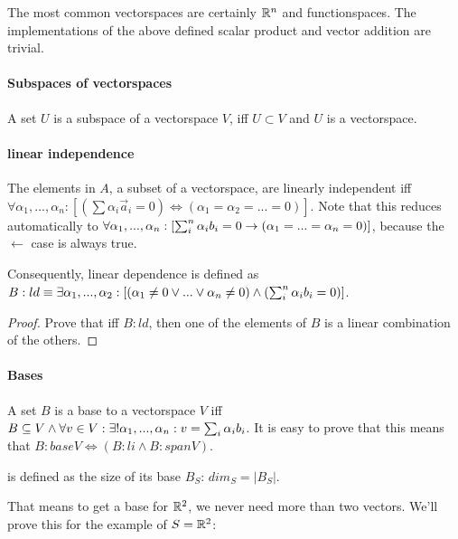 The most common vectorspaces are certainly $\mathbb{R}^n$ and functionspaces.
The implementations of the above defined scalar product and vector addition are trivial.







\paragraph{Subspaces of vectorspaces}
A set $U$ is a subspace of a vectorspace $V$, iff $U \subset V$ and $U$ is a vectorspace.








\paragraph{linear independence} 
The elements in $A$, a subset of a vectorspace, are linearly independent iff $\forall \alpha_1, ...,\alpha_n: [( \sum \alpha_i \vec{a}_i = 0 ) \iff ( \alpha_1 = \alpha_2 = ... = 0 )]$. Note that this reduces automatically to $\forall \alpha_1, ...,\alpha_n: [\sum_i^n \alpha_i b_i = 0 \to (\alpha_1 = ... = \alpha_n = 0)]$, because the $\leftarrow$ case is always true. 

Consequently, linear dependence is defined as $B:ld \equiv \exists \alpha_1, ..., \alpha_2: [(\alpha_1 \neq 0 \lor ... \lor \alpha_n \neq 0) \land ( \sum_i^n \alpha_i b_i = 0 )]$.


\begin{proof}
    Prove that iff $B:ld$, then one of the elements of $B$ is a linear combination of the others. 
\end{proof}








\paragraph{Bases}
A set $B$ is a base to a vectorspace $V$ iff $ B \subseteq V \land  \forall v \in V: \exists ! \alpha_1, ..., \alpha_n : v = \sum_i \alpha_i b_i $. It is easy to prove that this means that
$ B:baseV \iff ( B:li \land B:spanV ) $. 


\begin{definition}
    is defined as the size of its base $B_S$: $dim_S = |B_S|$. 
\end{definition}
That means to get a base for $\mathbb{R}^2$, we never need more than two vectors. We'll prove this for the example of $S = \mathbb{R}^2$:

